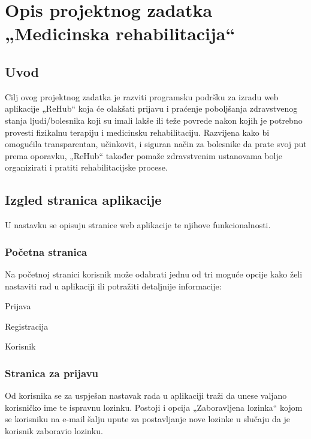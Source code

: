 \chapter{Opis projektnog zadatka „Medicinska rehabilitacija“}



\section{Uvod}

Cilj ovog projektnog zadatka je razviti programsku podršku za izradu web aplikacije „ReHub“ koja će olakšati prijavu i praćenje poboljšanja zdravstvenog stanja ljudi/bolesnika koji su imali lakše ili teže povrede nakon kojih je potrebno provesti fizikalnu terapiju i medicinsku rehabilitaciju. Razvijena kako bi omogućila transparentan, učinkovit, i siguran način za bolesnike da prate svoj put prema oporavku, „ReHub“ također pomaže zdravstvenim ustanovama bolje organizirati i pratiti rehabilitacijske procese.

\section{Izgled stranica aplikacije}

U nastavku se opisuju stranice web aplikacije te njihove funkcionalnosti.

\subsection{Početna stranica}

Na početnoj stranici korisnik može odabrati jednu od tri moguće opcije kako želi nastaviti rad u aplikaciji ili potražiti detaljnije informacije:

\begin{packed_item}
	
	\item  Prijava
	\item  Registracija
	\item  Korisnik
	
\end{packed_item}

\subsection{Stranica za prijavu}

Od korisnika se za uspješan nastavak rada u aplikaciji traži da unese valjano korisničko ime te ispravnu lozinku. Postoji i opcija „Zaboravljena lozinka“ kojom se korisniku na e-mail šalju upute za postavljanje nove lozinke u slučaju da je korisnik zaboravio lozinku.

